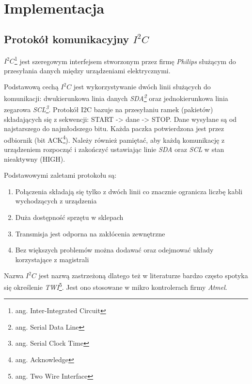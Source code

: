 \documentclass{xmgr}
\begin{document}

\chapter{Implementacja}
\section{Protokół komunikacyjny $I^2C$}
\emph{$I^2C$}\footnote{ang. Inter-Integrated Circuit} jest szeregowym interfejsem stworzonym przez firmę \emph{Philips} służącym do przesyłania danych między urządzeniami elektrycznymi. 

Podstawową cechą \emph{$I^2C$} jest wykorzystywanie dwóch linii służących do komunikacji: dwukierunkowa linia danych \emph{SDA\footnote{ang. Serial Data Line}} oraz jednokierunkowa linia zegarowa \emph{SCL\footnote{ang. Serial Clock Time}}. Protokół I2C bazuje na przesyłaniu ramek (pakietów) składających się z sekwencji: START -> dane -> STOP. Dane wysyłane są od najstarszego do najmłodszego bitu. Każda paczka potwierdzona jest przez odbiornik (bit ACK\footnote{ang. Acknowledge}). Należy również pamiętać, aby każdą komunikację z urządzeniem rozpocząć i zakończyć ustawiając linie \emph{SDA} oraz \emph{SCL} w stan nieaktywny (HIGH).


 Podstawowymi zaletami protokołu są:
\begin{enumerate}
	\item Połączenia składają się tylko z dwóch linii co znacznie ogranicza liczbę kabli wychodzących z urządzenia
	\item Duża dostępność sprzętu w sklepach
	\item Transmisja jest odporna na zakłócenia zewnętrzne
	\item Bez większych problemów można dodawać oraz odejmować układy korzystające z magistrali
\end{enumerate}

Nazwa $I^2C$ jest nazwą zastrzeżoną dlatego też w literaturze bardzo często spotyka się określenie \emph{TWI}\footnote{ang. Two Wire Interface}. Jest ono stosowane w mikro kontrolerach firmy \emph{Atmel}. 
\end{document}
